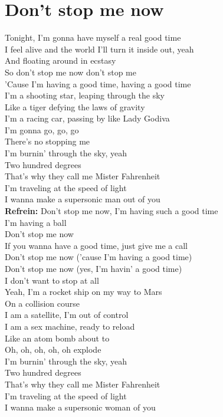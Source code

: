 \section{Don't stop me now}
Tonight, I'm gonna have myself a real good time\\
I feel alive and the world I'll turn it inside out, yeah\\
And floating around in ecstasy\\
So don't stop me now don't stop me\\
'Cause I'm having a good time, having a good time\\

I'm a shooting star, leaping through the sky\\
Like a tiger defying the laws of gravity\\
I'm a racing car, passing by like Lady Godiva\\
I'm gonna go, go, go\\
There's no stopping me\\
I'm burnin' through the sky, yeah\\
Two hundred degrees\\
That's why they call me Mister Fahrenheit\\
I'm traveling at the speed of light\\
I wanna make a supersonic man out of you\\

\textbf{Refrein:}
Don't stop me now, I'm having such a good time\\
I'm having a ball\\
Don't stop me now\\
If you wanna have a good time, just give me a call\\
Don't stop me now ('cause I'm having a good time)\\
Don't stop me now (yes, I'm havin' a good time)\\
I don't want to stop at all\\

Yeah, I'm a rocket ship on my way to Mars\\
On a collision course\\
I am a satellite, I'm out of control\\
I am a sex machine, ready to reload\\
Like an atom bomb about to\\
Oh, oh, oh, oh, oh explode\\
I'm burnin' through the sky, yeah\\
Two hundred degrees\\
That's why they call me Mister Fahrenheit\\
I'm traveling at the speed of light\\
I wanna make a supersonic woman of you\\

